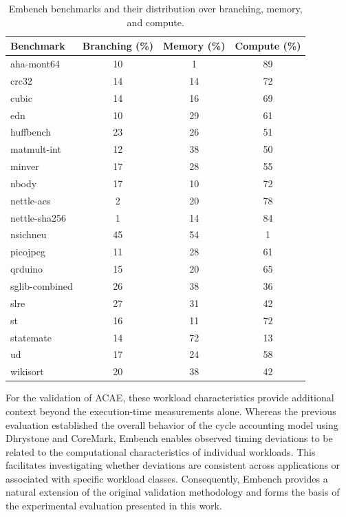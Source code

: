 \documentclass[conference]{IEEEtran}
\begin{document}
			\begin{table}[ht]
				\centering
				\caption{Embench benchmarks and their distribution over branching, memory, and compute. \cite{10970203}}
				\label{tab:embench_workload_dist}
				\begin{tabular}{lccc}
					\hline
					Benchmark & Branching (\%) & Memory (\%) & Compute (\%) \\
					\hline
					aha-mont64      & 10 &  1 & 89 \\
					crc32           & 14 & 14 & 72 \\
					cubic           & 14 & 16 & 69 \\
					edn             & 10 & 29 & 61 \\
					huffbench       & 23 & 26 & 51 \\
					matmult-int     & 12 & 38 & 50 \\
					minver          & 17 & 28 & 55 \\
					nbody           & 17 & 10 & 72 \\
					nettle-aes      &  2 & 20 & 78 \\
					nettle-sha256   &  1 & 14 & 84 \\
					nsichneu        & 45 & 54 &  1 \\
					picojpeg        & 11 & 28 & 61 \\
					qrduino         & 15 & 20 & 65 \\
					sglib-combined  & 26 & 38 & 36 \\
					slre            & 27 & 31 & 42 \\
					st              & 16 & 11 & 72 \\
					statemate       & 14 & 72 & 13 \\
					ud              & 17 & 24 & 58 \\
					wikisort        & 20 & 38 & 42 \\
					\hline
				\end{tabular}
			\end{table}

			For the validation of \ac{ACAE}, these workload characteristics provide additional context beyond the execution-time measurements alone.
			Whereas the previous evaluation established the overall behavior of the cycle accounting model using Dhrystone and CoreMark, Embench enables observed timing deviations to be related to the computational characteristics of individual workloads.
			This facilitates investigating whether deviations are consistent across applications or associated with specific workload classes.
			Consequently, Embench provides a natural extension of the original validation methodology and forms the basis of the experimental evaluation presented in this work.
\end{document}
